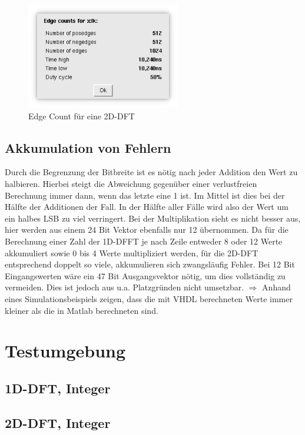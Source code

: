  \begin{figure}[ht]
  \centering
  \includegraphics[width=0.6\textwidth]{img/Simulation_edge_count_clk.png}
  \caption{Edge Count für eine 2D-DFT}
 \end{figure}


 \subsection{Akkumulation von Fehlern}
 Durch die Begrenzung der Bitbreite ist es nötig nach jeder Addition den Wert zu halbieren. Hierbei steigt die Abweichung gegenüber einer verlustfreien Berechnung immer dann, 
 wenn das letzte eine 1 ist. Im Mittel ist dies bei der Hälfte der Additionen der Fall. In der Hälfte aller Fälle wird also der Wert um ein halbes LSB zu viel verringert.
 Bei der Multiplikation sieht es nicht besser aus, hier werden aus einem 24 Bit Vektor ebenfalls nur 12 übernommen.
 Da für die Berechnung einer Zahl der 1D-DFFT je nach Zeile entweder 8 oder 12 Werte akkumuliert sowie 0 bis 4 Werte multipliziert werden, für die 2D-DFT entsprechend doppelt 
 so viele, akkumulieren sich zwangsläufig Fehler. Bei 12 Bit Eingangswerten wäre ein 47 Bit Ausgangsvektor nötig, um dies vollständig zu vermeiden. Dies ist jedoch aus u.a.
 Platzgründen nicht umsetzbar.
 $\Rightarrow$ Anhand eines Simulationsbeispiels zeigen, dass die mit VHDL berechneten Werte immer kleiner als die in Matlab berechneten sind.

 \section{Testumgebung}
 \subsection{1D-DFT, Integer}
 \subsection{2D-DFT, Integer}
